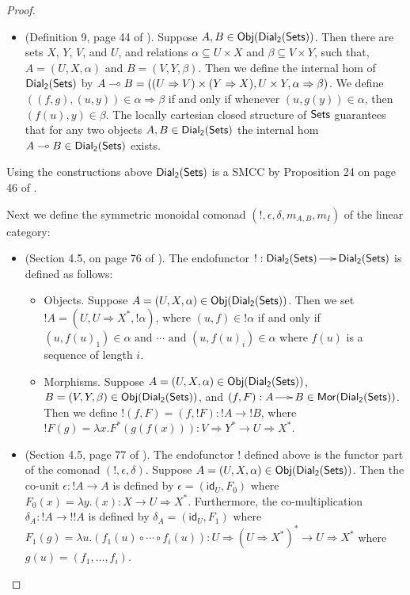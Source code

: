 \begin{proof}
\begin{center}
\begin{itemize}
    \item (Definition 9, page 44 of \cite{dePaiva:1988}). Suppose
      $A,B \in \mathsf{Obj}(\mathsf{Dial_2}(\mathsf{Sets}))$.  Then there are sets $X$, $Y$, $V$, and
      $U$, and relations $\alpha \subseteq U \times X$ and
      $\beta \subseteq V \times Y$, such that, $A = (U,X,\alpha)$ and
      $B = (V,Y,\beta)$.  Then we define the internal hom of $\mathsf{Dial_2}(\mathsf{Sets})$
      by $A \multimap B = ((U \Rightarrow V) \times (Y \Rightarrow X),U
      \times Y,\alpha \Rightarrow \beta)$.  We define $((f,g),(u,y))
      \in \alpha \Rightarrow \beta$ if and only if whenever $(u,g(y))
      \in \alpha$, then $(f(u),y) \in \beta$.  The locally cartesian 
      closed structure of $\mathsf{Sets}$ guarantees that for any two objects $A, B \in
      \mathsf{Dial_2}(\mathsf{Sets})$ the internal hom $A \multimap B \in \mathsf{Dial_2}(\mathsf{Sets})$ exists.      
    \end{itemize}
  \end{center}
  Using the constructions above $\mathsf{Dial_2}(\mathsf{Sets})$ is a SMCC by Proposition 24
  on page 46 of \cite{dePaiva:1988}.  

  Next we define the symmetric monoidal comonad
  $(!,\epsilon,\delta,m_{A,B},m_I)$ of the linear category:
  \begin{center}
    \begin{itemize}
    \item (Section 4.5, on page 76 of \cite{dePaiva:1988}). The
      endofunctor $! : \mathsf{Dial_2}(\mathsf{Sets}) \to \mathsf{Dial_2}(\mathsf{Sets})$ is defined as follows:
      \begin{itemize}
      \item Objects. Suppose $A = (U,X,\alpha) \in \mathsf{Obj}(\mathsf{Dial_2}(\mathsf{Sets}))$.  Then
        we set $!A = (U,U \Rightarrow X^*, !\alpha)$, where
        $(u,f) \in !\alpha$ if and only if
        $(u,f(u)_1) \in \alpha \text{ and } \cdots \text{ and }
        (u,f(u)_i) \in \alpha$ where $f(u)$ is a sequence of length $i$.

      \item Morphisms. Suppose $A = (U,X,\alpha) \in \mathsf{Obj}(\mathsf{Dial_2}(\mathsf{Sets}))$,
        $B = (V,Y,\beta) \in \mathsf{Obj}(\mathsf{Dial_2}(\mathsf{Sets}))$, and
        $(f,F) : A \to B \in \mathsf{Mor(\mathsf{Dial_2}(\mathsf{Sets}))}$.  Then we define 
        $!(f,F) = (f,!F) : !A \to !B$, where $!F(g) = \lambda
        x.F^*(g(f(x))) : V \Rightarrow Y^* \to U \Rightarrow X^*$.
      \end{itemize}

    \item (Section 4.5, page 77 of \cite{dePaiva:1988}). The
      endofunctor $!$ defined above is the functor part of the comonad
      $(!,\epsilon, \delta)$.  Suppose
      $A = (U,X,\alpha) \in \mathsf{Obj}(\mathsf{Dial_2}(\mathsf{Sets}))$. Then the co-unit
      $\epsilon : !A \to A$ is defined by $\epsilon =
      (\mathsf{id}_U,F_0)$ where $F_0(x) = \lambda y.(x) : X \to U
      \Rightarrow X^*$.  
      Furthermore, the co-multiplication $\delta_A
      : !A \to !!A$ is defined by $\delta_A = (\mathsf{id}_U,F_1)$
      where $F_1(g) = \lambda u.(f_1(u) \circ \cdots \circ f_i(u)) : U \Rightarrow (U
      \Rightarrow X^*)^* \to U \Rightarrow X^*$ where $g(u) = (f_1,\ldots,f_i)$.


\end{itemize}
\end{center}
\end{proof}
